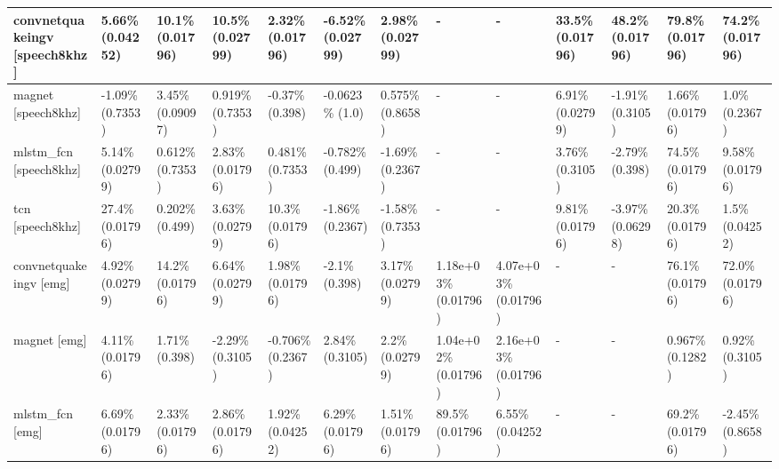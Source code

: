 \begin{table}[]
\begin{adjustwidth}{-1in}{-1in}
\begin{tabular}{|l|l|l|l|l|l|l|l|l|l|l|l|l|}
convnetquakeingv [speech8khz] & \cellcolor{green} 5.66\% (0.04252) & \cellcolor{green} 10.1\% (0.01796) & \cellcolor{green} 10.5\% (0.02799) & \cellcolor{green} 2.32\% (0.01796) & \cellcolor{red} -6.52\% (0.02799) & \cellcolor{green} 2.98\% (0.02799) & - & - & \cellcolor{green} 33.5\% (0.01796) & \cellcolor{green} 48.2\% (0.01796) & \cellcolor{green} 79.8\% (0.01796) & \cellcolor{green} 74.2\% (0.01796) \\ \hline
magnet [speech8khz] & -1.09\% (0.7353) & 3.45\% (0.09097) & 0.919\% (0.7353) & -0.37\% (0.398) & -0.0623\% (1.0) & 0.575\% (0.8658) & - & - & \cellcolor{green} 6.91\% (0.02799) & -1.91\% (0.3105) & \cellcolor{green} 1.66\% (0.01796) & 1.0\% (0.2367) \\ \hline
mlstm\_fcn [speech8khz] & \cellcolor{green} 5.14\% (0.02799) & 0.612\% (0.7353) & \cellcolor{green} 2.83\% (0.01796) & 0.481\% (0.7353) & -0.782\% (0.499) & -1.69\% (0.2367) & - & - & 3.76\% (0.3105) & -2.79\% (0.398) & \cellcolor{green} 74.5\% (0.01796) & \cellcolor{green} 9.58\% (0.01796) \\ \hline
tcn [speech8khz] & \cellcolor{green} 27.4\% (0.01796) & 0.202\% (0.499) & \cellcolor{green} 3.63\% (0.02799) & \cellcolor{green} 10.3\% (0.01796) & -1.86\% (0.2367) & -1.58\% (0.7353) & - & - & \cellcolor{green} 9.81\% (0.01796) & -3.97\% (0.06298) & \cellcolor{green} 20.3\% (0.01796) & \cellcolor{green} 1.5\% (0.04252) \\ \hline
convnetquakeingv [emg] & \cellcolor{green} 4.92\% (0.02799) & \cellcolor{green} 14.2\% (0.01796) & \cellcolor{green} 6.64\% (0.02799) & \cellcolor{green} 1.98\% (0.01796) & -2.1\% (0.398) & \cellcolor{green} 3.17\% (0.02799) & \cellcolor{green} 1.18e+03\% (0.01796) & \cellcolor{green} 4.07e+03\% (0.01796) & - & - & \cellcolor{green} 76.1\% (0.01796) & \cellcolor{green} 72.0\% (0.01796) \\ \hline
magnet [emg] & \cellcolor{green} 4.11\% (0.01796) & 1.71\% (0.398) & -2.29\% (0.3105) & -0.706\% (0.2367) & 2.84\% (0.3105) & \cellcolor{green} 2.2\% (0.02799) & \cellcolor{green} 1.04e+02\% (0.01796) & \cellcolor{green} 2.16e+03\% (0.01796) & - & - & 0.967\% (0.1282) & 0.92\% (0.3105) \\ \hline
mlstm\_fcn [emg] & \cellcolor{green} 6.69\% (0.01796) & \cellcolor{green} 2.33\% (0.01796) & \cellcolor{green} 2.86\% (0.01796) & \cellcolor{green} 1.92\% (0.04252) & \cellcolor{green} 6.29\% (0.01796) & \cellcolor{green} 1.51\% (0.01796) & \cellcolor{green} 89.5\% (0.01796) & \cellcolor{green} 6.55\% (0.04252) & - & - & \cellcolor{green} 69.2\% (0.01796) & -2.45\% (0.8658) \\ \hline

\end{tabular}
\end{adjustwidth}
\end{table}
